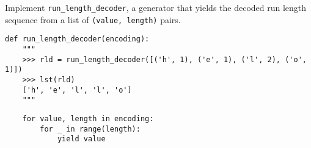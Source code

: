 \begin{blocksection}
\question Implement \lstinline$run_length_decoder$, a generator that yields the decoded
run length sequence from a list of \lstinline$(value, length)$ pairs.

\begin{lstlisting}
def run_length_decoder(encoding):
    """
    >>> rld = run_length_decoder([('h', 1), ('e', 1), ('l', 2), ('o', 1)])
    >>> lst(rld)
    ['h', 'e', 'l', 'l', 'o']
    """
\end{lstlisting}

\begin{solution}[0.7in]
\begin{lstlisting}
    for value, length in encoding:
        for _ in range(length):
            yield value
\end{lstlisting}
\end{solution}
\end{blocksection}
